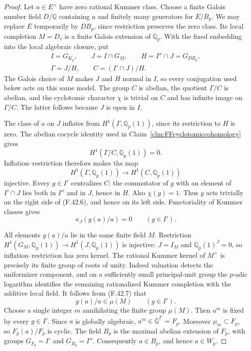 \documentclass[11pt]{article}
\begin{document}
\begin{proof}
Let \(a\in E^\times\) have zero
rational Kummer class. Choose a finite
Galois number field \(D/\mathbb Q\)
containing \(a\) and finitely many
generators for \(E/B_p\). We may
replace \(E\) temporarily by
\(DB_p\), since restriction preserves
the zero class. Its local completion
\(M=D_v\) is a finite Galois extension
of \(\mathbb Q_p\). With the fixed
embedding into the local algebraic
closure, put
\[
 \begin{gathered}
 I=G_{K_p},\qquad J=I\cap G_M,\qquad
 H=I''\cap J=G_{DB_p},\\
 \Gamma=J/H,\qquad C=(I'\cap J)/H.
 \end{gathered}
                                                        \tag{F.42.5}
\]
The Galois choice of \(M\) makes
\(J\) and \(H\) normal in \(I\),
so every conjugation used below acts
on this same model. The group \(C\)
is abelian, the quotient \(\Gamma/C\)
is abelian, and the cyclotomic
character \(\chi\) is trivial on
\(C\) and has infinite image on
\(\Gamma/C\). The latter follows
because \(J\) is open in \(I\).

The class of \(a\) on \(J\)
inflates from \(H^1(\Gamma,\mathbb Q_p(1))\),
since its restriction to \(H\) is
zero. The abelian cocycle identity
used in Claim~\ref{clm:FFcyclotomiccohomology}
gives
\[
                 H^1(\Gamma/C,\mathbb Q_p(1))=0.
\]
Inflation--restriction therefore makes
the map
\[
 H^1(\Gamma,\mathbb Q_p(1))
       \longrightarrow H^1(C,\mathbb Q_p(1))
                                                        \tag{F.42.6}
\]
injective. Every \(g\in I'\)
centralizes \(C\): the commutator
of \(g\) with an element of
\(I'\cap J\) lies both in
\(I''\) and in \(J\), hence
in \(H\). Also \(\chi(g)=1\).
Thus \(g\) acts trivially on the
right side of (F.42.6), and hence
on its left side. Functoriality of
Kummer classes gives
\[
                         \kappa_J(g(a)/a)=0
                         \qquad(g\in I').
                                                        \tag{F.42.7}
\]

All elements \(g(a)/a\) lie in
the same finite field \(M\).
Restriction
\(H^1(G_M,\mathbb Q_p(1))
\longrightarrow H^1(J,\mathbb Q_p(1))\)
is injective: \(J=I_M\) and
\(\mathbb Q_p(1)^J=0\), so
inflation--restriction has zero
kernel. The rational Kummer kernel
of \(M^\times\) is precisely its
finite group of roots of unity.
Indeed valuation detects the
uniformizer component, and on a
sufficiently small principal-unit
group the \(p\)-adic logarithm
identifies the remaining rationalized
Kummer completion with the additive
local field. It follows from
(F.42.7) that
\[
                            g(a)/a\in\mu(M)
                            \qquad(g\in I').
                                                        \tag{F.42.8}
\]
Choose a single integer \(m\)
annihilating the finite group
\(\mu(M)\). Then \(a^m\) is
fixed by every \(g\in I'\).
Since \(a\) is globally algebraic,
\(a^m\in\overline{\mathbb Q}^{I'}=F_p\).
Moreover \(\mu_m\subset F_p\),
so \(F_p(a)/F_p\) is cyclic.
The field \(B_p\) is the maximal
abelian extension of \(F_p\), with
groups \(G_{F_p}=I'\) and
\(G_{B_p}=I''\). Consequently
\(a\in B_p\), and hence
\(a\in W_p\).


\end{proof}
\end{document}
